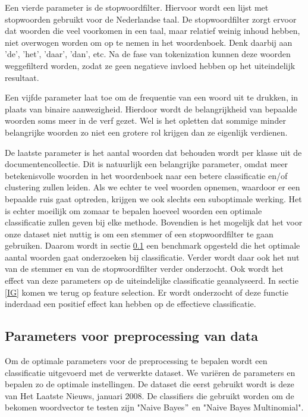 Een vierde parameter is de stopwoordfilter. Hiervoor wordt een lijst met stopwoorden gebruikt voor de Nederlandse taal. De stopwoordfilter zorgt ervoor dat woorden die veel voorkomen in een taal, maar relatief weinig inhoud hebben, niet overwogen worden om op te nemen in het woordenboek. Denk daarbij aan 'de', 'het', 'daar', 'dan', etc. Na de fase van tokenization kunnen deze woorden weggefilterd worden, zodat ze geen negatieve invloed hebben op het uiteindelijk resultaat.

Een vijfde parameter laat toe om de frequentie van een woord uit te drukken, in plaats van binaire aanwezigheid. Hierdoor wordt de belangrijkheid van bepaalde woorden soms meer in de verf gezet. Wel is het opletten dat sommige minder belangrijke woorden zo niet een grotere rol krijgen dan ze eigenlijk verdienen.

De laatste parameter is het aantal woorden dat behouden wordt per klasse uit de documentencollectie. Dit is natuurlijk een belangrijke parameter, omdat meer betekenisvolle woorden in het woordenboek naar een betere classificatie en/of clustering zullen leiden. Als we echter te veel woorden opnemen, waardoor er een bepaalde ruis gaat optreden, krijgen we ook slechts een suboptimale werking. Het is echter moeilijk om zomaar te bepalen hoeveel woorden een optimale classificatie zullen geven bij elke methode. Bovendien is het mogelijk dat het voor onze dataset niet nuttig is om een stemmer of een stopwoordfilter te gaan gebruiken. Daarom wordt in sectie \ref{parameters-voor-preprocessing} een benchmark opgesteld die het optimale aantal woorden gaat onderzoeken bij classificatie. Verder wordt daar ook het nut van de stemmer en van de stopwoordfilter verder onderzocht. Ook wordt het effect van deze parameters op de uiteindelijke classificatie geanalyseerd. 
In sectie \ref{IG} komen we terug op feature selection. Er wordt onderzocht of deze functie inderdaad een positief effect kan hebben op de effectieve classificatie.

\subsection{Parameters voor preprocessing van data}\label{parameters-voor-preprocessing}

Om de optimale parameters voor de preprocessing te bepalen wordt een classificatie uitgevoerd met de verwerkte dataset. We vari\"eren de parameters en bepalen zo de optimale instellingen. De dataset die eerst gebruikt wordt is deze van Het Laatste Nieuws, januari 2008. De classifiers die gebruikt worden om de bekomen woordvector te testen zijn "Naive Bayes$"$ en "Naive Bayes Multinomial". 

